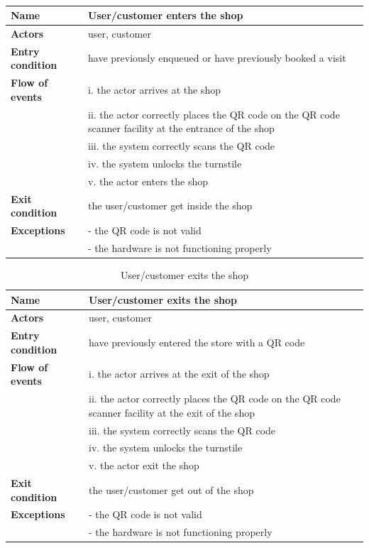 \begin{table}[h!]
    \centering
    \begin{tabular}{@{}P{0.2\textwidth}P{0.70\textwidth}@{}}
        \toprule
        \textbf{Name}                 & User/customer enters the shop\\
        \midrule
        \textbf{Actors}               & user, customer\\
        \textbf{Entry condition}      & have previously enqueued or have previously booked a visit\\
        \textbf{Flow of events}            
        & i. the actor arrives at the shop\\
        & ii. the actor correctly places the QR code on the QR code scanner facility at the entrance of the shop\\
        & iii. the system correctly scans the QR code\\
        & iv. the system unlocks the turnstile\\
        & v. the actor enters the shop\\
        \textbf{Exit condition}       & the user/customer get inside the shop\\
        \textbf{Exceptions}           
        & - the QR code is not valid\\
        & - the hardware is not functioning properly\\
        \bottomrule
    \end{tabular}
\caption{}
\label{table:entershop}
\end{table}

\begin{table}[h!]
    \centering
    \begin{tabular}{@{}P{0.2\textwidth}P{0.70\textwidth}@{}}
        \toprule
        \textbf{Name}                 & User/customer exits the shop\\
        \midrule
        \textbf{Actors}               & user, customer\\
        \textbf{Entry condition}      & have previously entered the store with a QR code\\
        \textbf{Flow of events}            
        & i. the actor arrives at the exit of the shop\\
        & ii. the actor correctly places the QR code on the QR code scanner facility at the exit of the shop\\
        & iii. the system correctly scans the QR code\\
        & iv. the system unlocks the turnstile\\
        & v. the actor exit the shop\\
        \textbf{Exit condition}       & the user/customer get out of the shop\\
        \textbf{Exceptions}           
        & - the QR code is not valid\\
        & - the hardware is not functioning properly\\
        \bottomrule
    \end{tabular}
\caption{User/customer exits the shop}
\label{table:exitshop}
\end{table}

